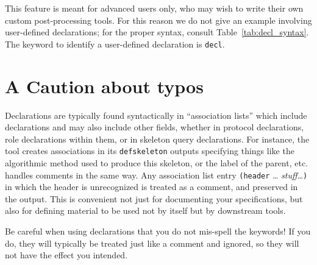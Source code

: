   This feature is meant
for advanced users only, who may wish to write their own custom
post-processing tools.  For this reason we do not give an example
involving user-defined declarations; for the proper syntax, consult
Table~\ref{tab:decl_syntax}.  The keyword to identify a user-defined
declaration is \texttt{decl}.

\fi



\section{A Caution about typos}
Declarations are typically found syntactically in ``association
lists'' which include declarations and may also include other fields,
whether in protocol declarations, role declarations within them, or in
skeleton query declarations.  For instance, the {\cpsa} tool creates
associations in its \texttt{defskeleton} outputs specifying things
like the algorithmic method used to produce this skeleton, or the
label of the parent, etc.  {\cpsa} handles comments in the same way.
Any association list entry \verb|(header| \dots
\emph{stuff}\dots\verb|)| in which the header is unrecognized is
treated as a comment, and preserved in the output.  This is convenient
not just for documenting your specifications, but also for defining
material to be used not by {\cpsa} itself but by downstream tools.

Be careful when using declarations that you do not mis-spell the
keywords!  If you do, they will typically be treated just like a
comment and ignored, so they will not have the effect you intended.

